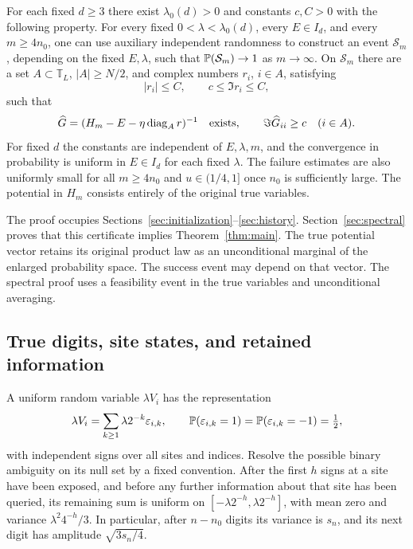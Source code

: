 \begin{proposition}\label{prop:certificate}
For each fixed $d\ge3$ there exist $\lambda_0(d)>0$ and constants $c,C>0$
with the following property. For every fixed $0<\lambda<\lambda_0(d)$,
every $E\in I_d$, and every $m\ge4n_0$, one
can use auxiliary independent randomness to construct an event
$\mathcal S_m$, depending on the fixed $E,\lambda$, such that
$\mathbb P(\mathcal S_m)\to1$ as $m\to\infty$.
On $\mathcal S_m$ there are a set $A\subset\mathbb T_L$, $|A|\ge N/2$,
and complex numbers $r_i$, $i\in A$, satisfying
\[
 |r_i|\le C,\qquad c\le\Im r_i\le C,
\]
such that
\[
 \widehat G=(H_m-E-\eta\operatorname{diag}_A r)^{-1}
 \quad\text{exists},\qquad
 \Im\widehat G_{ii}\ge c\quad(i\in A).
\]
For fixed $d$ the constants are independent of $E,\lambda,m$, and
the convergence in probability is uniform in $E\in I_d$ for each
fixed $\lambda$. The failure estimates are also uniformly small for
all $m\ge4n_0$ and $u\in(1/4,1]$ once $n_0$ is sufficiently large.
The potential in $H_m$ consists entirely of the original true variables.
\end{proposition}

The proof occupies Sections~\ref{sec:initialization}--\ref{sec:history}.
Section~\ref{sec:spectral} proves that this certificate implies
Theorem~\ref{thm:main}. The true potential vector retains its original
product law as an unconditional marginal of the enlarged probability
space. The success event may depend on that vector. The spectral proof
uses a feasibility event in the true variables and unconditional averaging.

\subsection{True digits, site states, and retained information}

A uniform random variable $\lambda V_i$ has the representation
\begin{equation}
 \lambda V_i=\sum_{k\ge1}\lambda2^{-k}\varepsilon_{i,k},
 \qquad \mathbb P(\varepsilon_{i,k}=1)
       =\mathbb P(\varepsilon_{i,k}=-1)=\tfrac12,
 \label{eq:history-binary}
\end{equation}
with independent signs over all sites and indices. Resolve the possible
binary ambiguity on its null set by a fixed convention. After the first
$h$ signs at a site have been exposed, and before any further information
about that site has been queried, its remaining sum is uniform on
$[-\lambda2^{-h},\lambda2^{-h}]$, with mean zero and variance
$\lambda^2 4^{-h}/3$. In particular, after $n-n_0$ digits its variance
is $s_n$, and its next digit has amplitude $\sqrt{3s_n/4}$.

